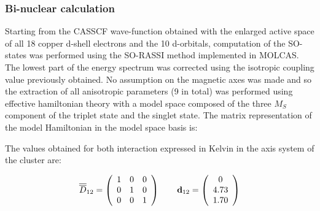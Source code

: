 \documentclass[12pt]{report}
\numberwithin{equation}{section}
\begin{document}
\subsubsection*{Bi-nuclear calculation}

Starting from the CASSCF wave-function obtained with the enlarged active space of all 18 copper d-shell electrons and the 10 d-orbitals, computation of the SO-states was performed using the SO-RASSI method implemented in MOLCAS.
The lowest part of the energy spectrum was corrected using the isotropic coupling value previously obtained.
No assumption on the magnetic axes was made and so the extraction of all anisotropic parameters (9 in total) was performed using effective hamiltonian theory with a model space composed of the three $M_S$ component of the triplet state and the singlet state.
The matrix representation of the model Hamiltonian in the model space basis is:
\begin{center}
    \centering
\end{center}

The values obtained for both interaction expressed in Kelvin in the axis system of the cluster are:

\[ \overline{\overline{D}}_{12}= \left( \begin{array}{c c c}
    1 & 0 & 0\\
    0 & 1 & 0\\
    0 & 0 & 1
    \end{array} \right)
    \qquad
    \vb{d}_{12}=
    \left( \begin{array}{c}
    0  \\
    4.73  \\
    1.70
    \end{array} \right)
    \]
    
\end{document}
